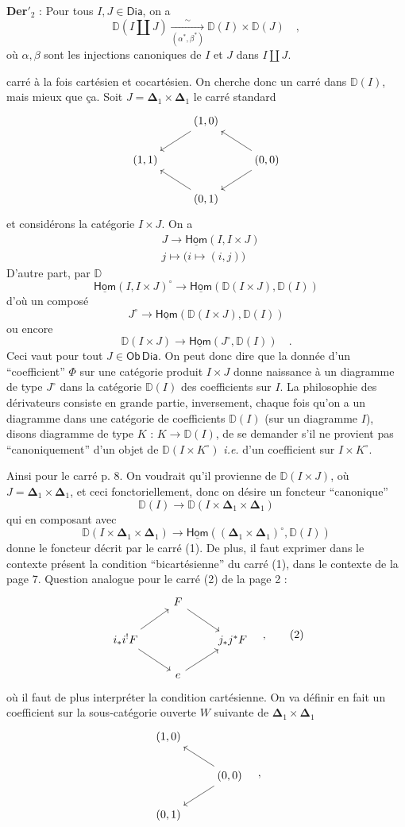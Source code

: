 \documentclass[11pt]{article}
\newcommand{\printedpage}[1]{\marginpar{\footnotesize p.~#1}}
\newcommand{\msp}[1]{\marginpar{\footnotesize [#1]}}
\newcommand{\Ob}{\mathsf{Ob}}
\newcommand{\Dia}{\mathsf{Dia}}
\newcommand{\DD}{\mathbb{D}}
\newcommand{\Hom}{\underline{\mathsf{Hom}}}
\newcommand{\Del}{\boldsymbol{\Delta}}
\begin{document}
\textbf{Der}$'_2$ : Pour tous $I, J \in \Dia$, on a
\[ \DD(I \amalg J) \xrightarrow[(\alpha^*, \beta^*)]{\sim} \DD(I) \times \DD(J) \quad , \]
où $\alpha, \beta$ sont les injections canoniques de $I$ et $J$ dans $I \amalg J$.

\printedpage{7}

carré à la fois cartésien et cocartésien. On cherche donc un carré dans $\DD(I)$, mais mieux que ça. Soit $J = \Del_1 \times \Del_1$ le carré standard
\[
\begin{tikzcd}
& (1,0) \arrow[dl] & \\
(1,1) & & (0,0) \arrow[ul] \arrow[dl] \\
& (0,1) \arrow[ul] &
\end{tikzcd}
\]
et considérons la catégorie $I \times J$. On a
\[
\begin{aligned}
& J \longrightarrow \Hom(I, I \times J) \\
& j \longmapsto \bigl(i \longmapsto (i,j)\bigr)
\end{aligned}
\]
D'autre part, par $\DD$
\[ \Hom(I, I \times J)^{\circ} \longrightarrow \Hom(\DD(I \times J), \DD(I)) \]
d'où un composé
\[ J^{\circ} \longrightarrow \Hom(\DD(I \times J), \DD(I)) \]
ou encore
\[ \DD(I \times J) \longrightarrow \Hom(J^{\circ}, \DD(I)) \quad . \]
Ceci vaut pour tout $J \in \Ob \, \Dia$. On peut donc dire que la donnée d'un “coefficient” $\Phi$ sur une catégorie produit $I \times J$ donne naissance à un diagramme de type $J^{\circ}$ dans la catégorie $\DD(I)$ des coefficients sur $I$. La philosophie
\msp{page 9}
des dérivateurs consiste en grande partie, inversement, chaque fois qu'on a un diagramme dans une catégorie de coefficients $\DD(I)$ (sur un diagramme $I$), disons diagramme de type $K$ : $K \to \DD(I)$, de se demander s'il ne provient pas “canoniquement” d'un objet de $\DD(I \times K^{\circ})$ \textit{i.e.} d'un coefficient sur $I \times K^{\circ}$.

Ainsi pour le carré p. 8. On voudrait qu'il provienne de $\DD(I \times J)$, où $J = \Del_1 \times \Del_1$, et ceci fonctoriellement, donc on désire un foncteur “canonique”
\[ \DD(I) \longrightarrow \DD(I \times \Del_1 \times \Del_1) \]
qui en composant avec
\[ \DD(I \times \Del_1 \times \Del_1) \longrightarrow \Hom((\Del_1 \times \Del_1)^{\circ}, \DD(I)) \]
\printedpage{8}
donne le foncteur décrit par le carré (1). De plus, il faut exprimer dans le contexte présent la condition “bicartésienne” du carré (1), dans le contexte de la page 7. Question analogue pour le carré (2) de la page 2 :
\[
\begin{tikzcd}
& F \arrow[dr] & \\
i_*i^!F \arrow[ur] \arrow[dr] & & j_*j^*F \\
& e \arrow[ur] &
\end{tikzcd}
\quad ,
\tag*{(2)}
\]
où il faut de plus interpréter la condition cartésienne. On va définir en fait un coefficient sur la sous-catégorie ouverte $W$ suivante de $\Del_1 \times \Del_1$
\[
\begin{tikzcd}
(1,0) & \\
& (0,0) \arrow[ul] \arrow[dl] \\
(0,1) &
\end{tikzcd}
\quad ,
\]
\end{document}
